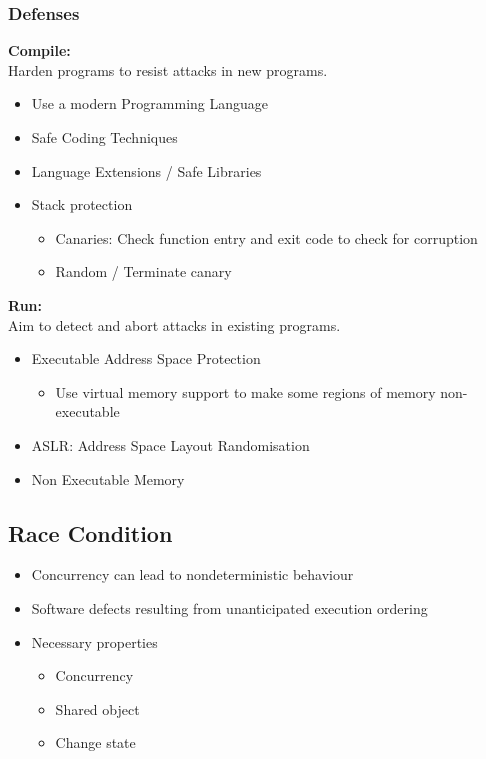 \subsubsection{Defenses}
\textbf{Compile:}\\
Harden programs to resist attacks in new programs.\\
\begin{itemize}
    \item Use a modern Programming Language
    \item Safe Coding Techniques
    \item Language Extensions / Safe Libraries
    \item Stack protection
    \begin{itemize}
        \item Canaries: Check function entry and exit code to check for corruption
        \item Random / Terminate canary
    \end{itemize}
\end{itemize}
\textbf{Run:}\\
Aim to detect and abort attacks in existing programs.\\
\begin{itemize}
    \item Executable Address Space Protection
    \begin{itemize}
        \item Use virtual memory support to make some regions of memory non-executable
    \end{itemize}
    \item ASLR: Address Space Layout Randomisation
    \item Non Executable Memory
\end{itemize}

\subsection{Race Condition}
\begin{itemize}
    \item Concurrency can lead to nondeterministic behaviour
    \item Software defects resulting from unanticipated execution ordering
    \item Necessary properties
    \begin{itemize}
        \item Concurrency
        \item Shared object
        \item Change state
    \end{itemize}
\end{itemize}

